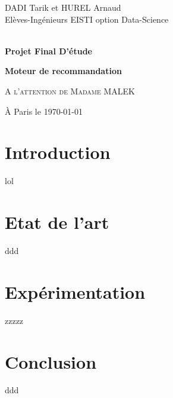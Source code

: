 \documentclass[11pt,a4paper]{article}
\begin{document}
\begin{center}
DADI Tarik et HUREL Arnaud\\
Elèves-Ingénieurs EISTI option Data-Science     
\vspace{3cm}



{\textbf{\Huge{\\Projet Final D'étude\\}}}
\vspace{1cm}


{\textbf{\Large{Moteur de recommandation\\}}}
\vspace{4cm}

\textsc{{\large{A l'attention de Madame MALEK\\}}}


\vspace{4cm}
À Paris le \today
\end{center}
\newpage

\tableofcontents
\newpage

\section{Introduction}
lol
\section{Etat de l'art}
ddd
\section{Expérimentation}
zzzzz
\section{Conclusion}
ddd
\end{document}
